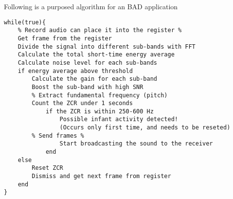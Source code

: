 Following is a purposed algorithm for an BAD application
\newpage
\begin{verbatim}
while(true){
    % Record audio can place it into the register %
    Get frame from the register 
    Divide the signal into different sub-bands with FFT
    Calculate the total short-time energy average  
    Calculate noise level for each sub-bands
    if energy average above threshold
        Calculate the gain for each sub-band
        Boost the sub-band with high SNR
        % Extract fundamental frequency (pitch)
        Count the ZCR under 1 seconds
            if the ZCR is within 250-600 Hz 
                Possible infant activity detected!
                (Occurs only first time, and needs to be reseted)
		% Send frames %
                Start broadcasting the sound to the receiver    
            end
    else
        Reset ZCR
        Dismiss and get next frame from register
    end
}
\end{verbatim}
